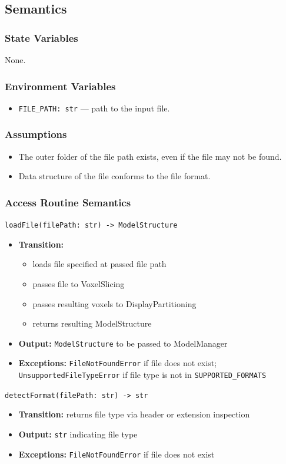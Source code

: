 \documentclass[12pt, titlepage]{article}
\begin{document}
\subsection{Semantics}

\subsubsection{State Variables}
None.

\subsubsection{Environment Variables}
\begin{itemize}
  \item \texttt{FILE\_PATH: str} — path to the input file.
\end{itemize}

\subsubsection{Assumptions}
\begin{itemize}
  \item The outer folder of the file path exists, even if the file may not be found.
  \item Data structure of the file conforms to the file format.
\end{itemize}

\subsubsection{Access Routine Semantics}
\texttt{loadFile(filePath: str) -> ModelStructure}
\begin{itemize}
  \item \textbf{Transition:}
  \begin{itemize}
    \item[-] loads file specified at passed file path
    \item[-] passes file to VoxelSlicing
    \item[-] passes resulting voxels to DisplayPartitioning
    \item[-] returns resulting ModelStructure
  \end{itemize}
  \item \textbf{Output:} \texttt{ModelStructure} to be passed to ModelManager
  \item \textbf{Exceptions:} \texttt{FileNotFoundError} if file does not exist; \texttt{UnsupportedFileTypeError} if file type is not in \texttt{SUPPORTED\_FORMATS}
\end{itemize}
\texttt{detectFormat(filePath: str) -> str}
\begin{itemize}
  \item \textbf{Transition:} returns file type via header or extension inspection
  \item \textbf{Output:} \texttt{str} indicating file type
  \item \textbf{Exceptions:} \texttt{FileNotFoundError} if file does not exist
\end{itemize}
\end{document}
